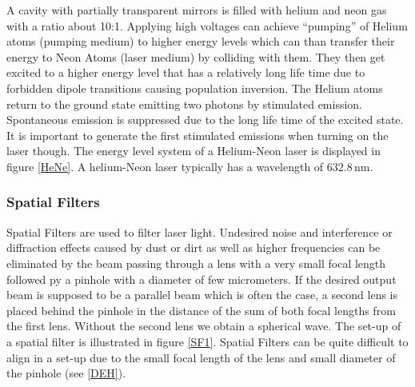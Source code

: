 A cavity with partially transparent mirrors is filled with helium and neon gas with a ratio about 10:1. Applying high voltages can achieve ``pumping'' of Helium atoms (pumping medium) to higher energy levels which can than transfer their energy to Neon Atoms (laser medium) by colliding with them. They then get excited to a higher energy level that has a relatively long life time due to forbidden dipole transitions causing population inversion.
The Helium atoms return to the ground state emitting two photons by stimulated emission. Spontaneous emission is suppressed due to the long life time of the excited state. It is important to generate the first stimulated emissions when turning on the laser though.
The energy level system of a Helium-Neon laser is displayed in figure \ref{HeNe}. A helium-Neon laser typically has a wavelength of $632.8\,\mathrm{nm}$.



\subsubsection{Spatial Filters \label{SF}}

Spatial Filters are used to filter laser light. Undesired noise and interference or diffraction effects caused by dust or dirt as well as higher frequencies can be eliminated by the beam passing through a lens with a very small focal length followed py a pinhole with a diameter of few micrometers. If the desired output beam is supposed to be a parallel beam which is often the case, a second lens is placed behind the pinhole in the distance of the sum of both focal lengths from the first lens. Without the second lens we obtain a spherical wave. The set-up of a spatial filter is illustrated in figure \ref{SF1}. Spatial Filters can be quite difficult to align in a set-up due to the small focal length of the lens and small diameter of the pinhole (see \ref{DEH}).



